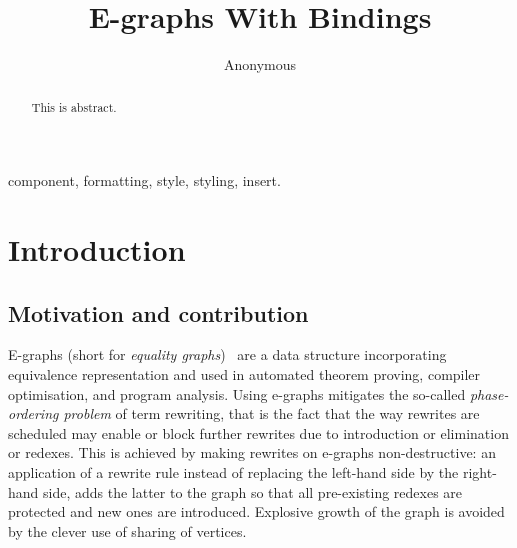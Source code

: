 \documentclass[peerreviewcls]{IEEEtran}
\begin{document}
\title{E-graphs With Bindings
}


\author{Anonymous}

\maketitle

\begin{abstract}
This is abstract.
\end{abstract}

\begin{IEEEkeywords}
component, formatting, style, styling, insert.
\end{IEEEkeywords}

\section{Introduction}

\subsection{Motivation and contribution}

E-graphs (short for \emph{equality graphs})~\cite{EggPaper} are a data structure incorporating equivalence representation and used in automated theorem proving, compiler optimisation, and program analysis. 
Using e-graphs mitigates the so-called \emph{phase-ordering problem} of term rewriting, that is the fact that the way rewrites are scheduled may enable or block further rewrites due to introduction or elimination or redexes. 
This is achieved by making rewrites on e-graphs non-destructive: an application of a rewrite rule instead of replacing the left-hand side by the right-hand side, adds the latter to the graph so that all pre-existing redexes are protected and new ones are introduced. 
Explosive growth of the graph is avoided by the clever use of sharing of vertices. 
\end{document}
